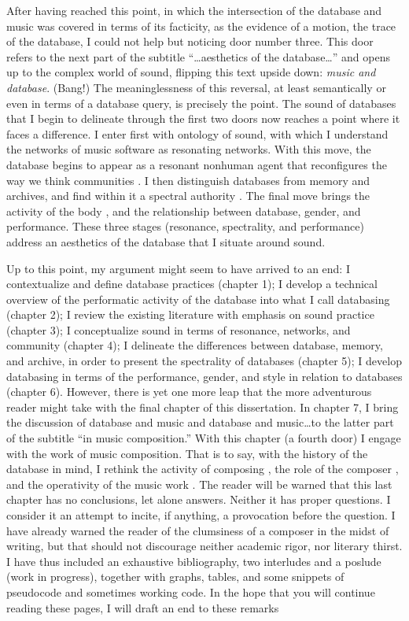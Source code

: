 After having reached this point, in which the intersection of the database and music was covered in terms of its facticity, as the evidence of a motion, the trace of the database, I could not help but noticing door number three. This door refers to the next part of the subtitle ``\dots aesthetics of the database\dots'' and opens up to the complex world of sound, flipping this text upside down: \textit{music and database}. (Bang!) The meaninglessness of this reversal, at least semantically or even in terms of a database query, is precisely the point. The sound of databases that I begin to delineate through the first two doors now reaches a point where it faces a difference. I enter first with  ontology of sound, with which I understand the networks of music software as resonating networks. With this move, the database begins to appear as a resonant nonhuman agent \parencite{Lat90:On} that reconfigures the way we think communities \parencite{Nan91:The}. I then distinguish databases from memory and archives, and find within it a spectral authority \parencites{Der78:Wri}{Der95:Arc}. The final move brings the activity of the body \parencite{But88:Per}, and the relationship between database, gender, and performance. These three stages (resonance, spectrality, and performance) address an aesthetics of the database that I situate around sound. 

Up to this point, my argument might seem to have arrived to an end: I contextualize and define database practices (chapter 1); I develop a technical overview of the performatic activity of the database into what I call databasing (chapter 2); I review the existing literature with emphasis on sound practice (chapter 3); I conceptualize sound in terms of resonance, networks, and community (chapter 4); I delineate the differences between database, memory, and archive, in order to present the spectrality of databases (chapter 5); I develop databasing in terms of the performance, gender, and style in relation to databases (chapter 6). However, there is yet one more leap that the more adventurous reader might take with the final chapter of this dissertation. In chapter 7, I bring the discussion of database and music and database and music\dots to the latter part of the subtitle ``in music composition.'' With this chapter (a fourth door) I engage with the work of music composition. That is to say, with the history of the database in mind, I rethink the activity of composing \parencite{Vag01:Som}, the role of the composer \parencite{Lew99:Int}, and the operativity of the music work \parencite{Cas00:The}. The reader will be warned that this last chapter has no conclusions, let alone answers. Neither it has proper questions. I consider it an attempt to incite, if anything, a provocation before the question. I have already warned the reader of the clumsiness of a composer in the midst of writing, but that should not discourage neither academic rigor, nor literary thirst. I have thus included an exhaustive bibliography, two interludes and a poslude (work in progress), together with graphs, tables, and some snippets of pseudocode and sometimes working code. In the hope that you will continue reading these pages, I will {draft} an end to these remarks
